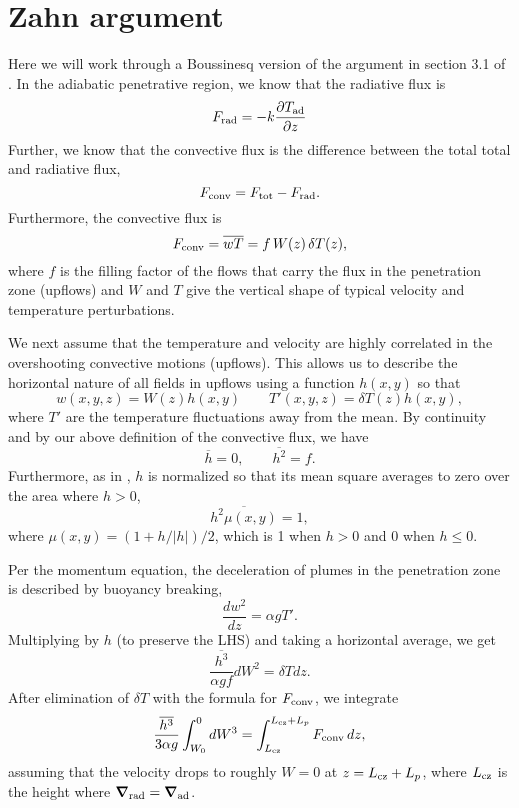 \documentclass[12pt]{article}
\renewcommand{\vec}[1]{\boldsymbol{#1}}
\newcommand{\grad}{\vec{\nabla}}
\begin{document}
\section{Zahn argument}
Here we will work through a Boussinesq version of the argument in section 3.1 of \citet{zahn1991}.
In the adiabatic penetrative region, we know that the radiative flux is
\begin{equation}
F_{\rm{rad}} = -k \frac{\partial T_{\rm{ad}}}{\partial z}
\end{equation}
Further, we know that the convective flux is the difference between the total total and radiative flux,
\begin{equation}
F_{\rm{conv}} = F_{\rm{tot}} - F_{\rm{rad}}.
\end{equation}
Furthermore, the convective flux is
\begin{equation}
F_{\rm{conv}} = \overline{w T} = f \, W(z) \, \delta T(z),
\end{equation}
where $f$ is the filling factor of the flows that carry the flux in the penetration zone (upflows) and $W$ and $T$ give the vertical shape of typical velocity and temperature perturbations.

We next assume that the temperature and velocity are highly correlated in the overshooting convective motions (upflows).
This allows us to describe the horizontal nature of all fields in upflows using a function $h(x,y)$ so that
\begin{equation}
w(x,y,z) = W(z) h(x,y)
\qquad
T'(x,y,z) = \delta T(z) h(x,y),
\end{equation}
where $T'$ are the temperature fluctuations away from the mean.
By continuity and by our above definition of the convective flux, we have
\begin{equation}
\overline{h} = 0,
\qquad
\overline{h^2} = f.
\end{equation}
Furthermore, as in \citet{zahn1991}, $h$ is normalized so that its mean square averages to zero over the area where $h > 0$,
\begin{equation}
\overline{h^2 \mu(x,y)} = 1,
\end{equation}
where $\mu(x,y) = (1 + h/|h|)/2$, which is 1 when $h > 0$ and 0 when $h \leq 0$.

Per the momentum equation, the deceleration of plumes in the penetration zone is described by buoyancy breaking,
\begin{equation}
\frac{d w^2}{dz} = \alpha g T'.
\end{equation}
Multiplying by $h$ (to preserve the LHS) and taking a horizontal average, we get
\begin{equation}
\frac{\overline{h^3}}{\alpha g f}d W^2 = \delta T dz.
\end{equation}
After elimination of $\delta T$ with the formula for $F_{\rm{conv}}$, we integrate
\begin{equation}
\frac{\overline{h^3}}{3 \alpha g}\int_{W_0}^0 dW^3 = \int_{L_{\rm{cz}}}^{L_{\rm{cz}} + L_p} F_{\rm{conv}}\, dz,
\label{eqn:buoyancy_integral}
\end{equation}
assuming that the velocity drops to roughly $W = 0$ at $z = L_{\rm{cz}} + L_p$, where $L_{\rm{cz}}$ is the height where $\grad_{\rm{rad}} = \grad_{\rm{ad}}$.
\end{document}
